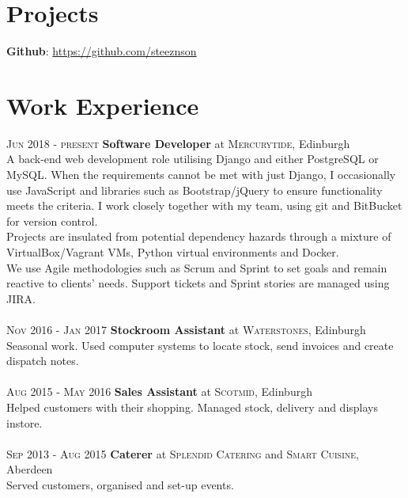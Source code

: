 \documentclass[14pt, a4paper]{extarticle}
\begin{document}
\begin{multicols}{2}
\section{Projects}
\noindent\textbf{Github}: \url{https://github.com/steeznson}

\section{Work Experience}
\noindent\textsc{Jun 2018 - present} \textbf{Software Developer}
at \textsc{Mercurytide}, Edinburgh\\
A back-end web development role utilising Django and either PostgreSQL or MySQL. When the requirements cannot be met with just Django, I occasionally use JavaScript and libraries such as Bootstrap/jQuery to ensure functionality meets the criteria. I work closely together with my team, using git and BitBucket for version control.\\
Projects are insulated from potential dependency hazards through a mixture of VirtualBox/Vagrant VMs, Python virtual environments and Docker.\\
We use Agile methodologies such as Scrum and Sprint to set goals and remain reactive to clients' needs. Support tickets and Sprint stories are managed using JIRA.\\~\\
\textsc{Nov 2016 - Jan 2017} \textbf{Stockroom Assistant}
at \textsc{Waterstones}, Edinburgh\\
Seasonal work. Used computer systems to locate stock, send invoices and create dispatch notes.\\~\\
\textsc{Aug 2015 - May 2016} \textbf{Sales Assistant}
at \textsc{Scotmid}, Edinburgh\\
Helped customers with their shopping. Managed stock, delivery and displays instore.\\~\\
\textsc{Sep 2013 - Aug 2015} \textbf{Caterer}
at \textsc{Splendid Catering} and \textsc{Smart Cuisine}, Aberdeen\\
Served customers, organised and set-up events.

\end{multicols}
\end{document}
